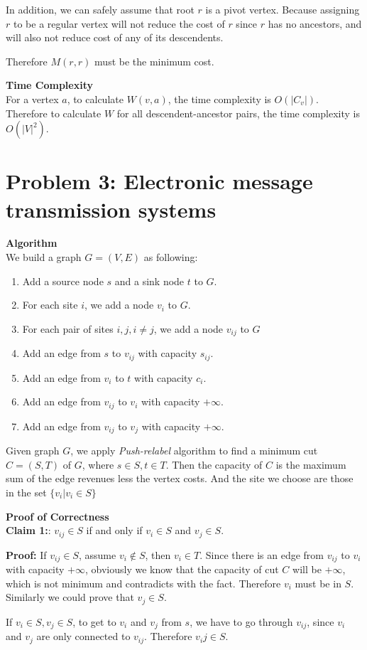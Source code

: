 \documentclass{article}
\newcommand{\Complexity}{\vspace{0.3cm} \noindent\textbf{Time Complexity} \vspace{0.2cm} \\}
\newcommand{\Proof}{\vspace{0.3cm} \noindent\textbf{Proof of Correctness} \vspace{0.2cm} \\}
\newcommand{\Algorithm}{\textbf{Algorithm} \vspace{0.2cm}\\}
\begin{document}
In addition, we can safely assume that root $r$ is a pivot vertex. Because assigning $r$ to be a
regular vertex will not reduce the cost of $r$ since $r$ has no ancestors, and will also not reduce
cost of any of its descendents. 

Therefore $M(r, r)$ must be the minimum cost.  

\Complexity
For a vertex $a$, to calculate $W(v, a)$, the time complexity is $O(|C_v|)$. Therefore to calculate
$W$ for all  descendent-ancestor pairs, the time complexity is $O(|V|^2)$.


\section*{Problem 3: Electronic message transmission systems}
\Algorithm
We build a graph $G = (V, E)$ as following:
\begin{enumerate}
  \item Add a source node $s$ and a sink node $t$ to $G$.
  \item For each site $i$, we add a node $v_i$ to $G$.
  \item For each pair of sites $i, j, i\neq j$, we add a node $v_{ij}$ to $G$
  \item Add an edge from $s$ to $v_{ij}$ with capacity $s_{ij}$.
  \item Add an edge from $v_i$ to $t$ with capacity $c_i$.
  \item Add an edge from $v_{ij}$ to $v_i$ with capacity $+\infty$.
  \item Add an edge from $v_{ij}$ to $v_j$ with capacity $+\infty$.
\end{enumerate}

Given graph $G$, we apply \textit{Push-relabel} algorithm to find a minimum cut $C = (S, T)$ of $G$,
where $s \in S, t \in T$. Then the capacity of $C$ is the maximum sum of the edge
revenues less the vertex costs. And the site we choose are those in the set $\{v_i | v_i \in S\}$ 

\Proof
\textbf{Claim 1:}: $v_{ij} \in S$ if and only if $v_i \in S$ and $v_j \in S$.

\textbf{Proof:} If $v_{ij} \in S$, assume $v_i \not\in S$, then $v_i \in T$. Since there is an edge
from $v_{ij}$ to $v_i$ with capacity $+\infty$, obviously we know that the capacity of cut $C$ will
be $+\infty$, which is not minimum and contradicts with the fact. Therefore $v_i$ must be in $S$.
Similarly we could prove that $v_j \in S$.

If $v_i \in S, v_j \in S$, to get to $v_i$ and $v_j$ from $s$, we have to go through $v_{ij}$, since
$v_i$ and $v_j$ are only connected to $v_{ij}$. Therefore $v_ij \in S$.
\end{document}
